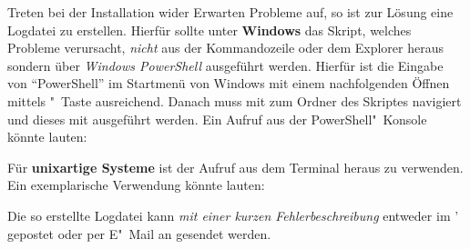 Treten bei der Installation wider Erwarten Probleme auf, so ist zur Lösung eine 
Logdatei zu erstellen. Hierfür sollte unter \textbf{Windows} das Skript, 
welches Probleme verursacht, \emph{nicht} aus der Kommandozeile oder dem 
Explorer heraus sondern über \emph{Windows PowerShell} ausgeführt werden. 
Hierfür ist die Eingabe von \enquote{PowerShell} im Startmenü von Windows mit 
einem nachfolgenden Öffnen mittels "~Taste ausreichend. 
Danach muss mit  zum Ordner des Skriptes navigiert und dieses mit 
ausgeführt werden. Ein Aufruf aus der PowerShell"~Konsole könnte lauten:
%
\begin{quoting}[rightmargin=0pt]
  \newline%
\end{quoting}
%
Für \textbf{unixartige Systeme} ist der Aufruf 
 aus dem Terminal heraus zu 
verwenden. Ein exemplarische Verwendung könnte lauten:
%
\begin{quoting}
  \newline
\end{quoting}
%
Die so erstellte Logdatei kann \emph{mit einer kurzen Fehlerbeschreibung} 
entweder im \Forum' gepostet oder per E"~Mail an \mailto{\TUDScriptContact}
gesendet werden.
%
